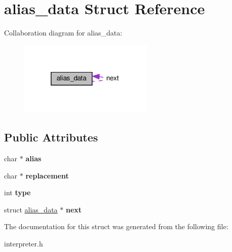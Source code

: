 \hypertarget{structalias__data}{}\section{alias\+\_\+data Struct Reference}
\label{structalias__data}


Collaboration diagram for alias\+\_\+data\+:\nopagebreak
\begin{figure}[H]
\begin{center}
\leavevmode
\includegraphics[width=181pt]{structalias__data__coll__graph}
\end{center}
\end{figure}
\subsection*{Public Attributes}
\begin{DoxyCompactItemize}
\item 
\mbox{\label{structalias__data_afa3c77bfbb429b96d0b0ca785c15b59e}} 
char $\ast$ {\bfseries alias}
\item 
\mbox{\label{structalias__data_a1e8e865209e68e26e8d2a1e4601db7cb}} 
char $\ast$ {\bfseries replacement}
\item 
\mbox{\label{structalias__data_a1253a42c6d693ae0e95fe3634806e2b8}} 
int {\bfseries type}
\item 
\mbox{\label{structalias__data_aa14a570620f2eccfc657449921c00547}} 
struct \hyperlink{structalias__data}{alias\+\_\+data} $\ast$ {\bfseries next}
\end{DoxyCompactItemize}


The documentation for this struct was generated from the following file\+:\begin{DoxyCompactItemize}
\item 
interpreter.\+h\end{DoxyCompactItemize}
